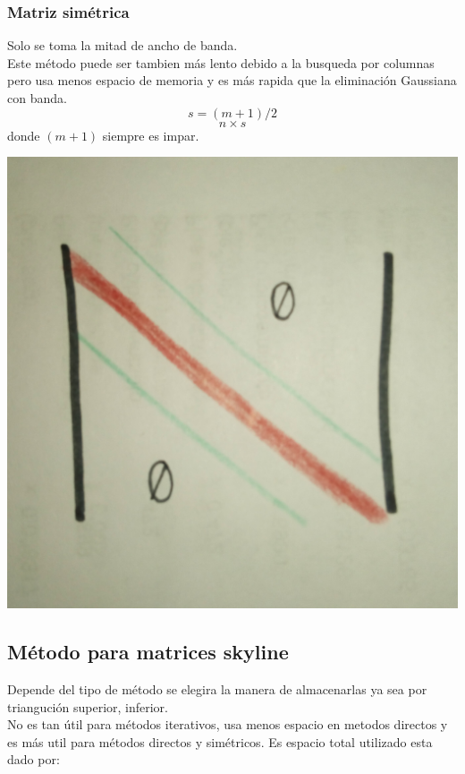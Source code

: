 \subsubsection{Matriz sim\'etrica}
Solo se toma la mitad de ancho de banda.\\
Este m\'etodo puede ser tambien m\'as lento debido a la busqueda por columnas pero usa menos espacio de memoria y es m\'as rapida que la eliminaci\'on Gaussiana con banda.
\begin{displaymath}
s=(m+1)/2
\end{displaymath}
\begin{displaymath}
n \times s
\end{displaymath}
donde $(m+1)$ siempre es impar.
\begin{center}
\includegraphics[scale=.05]{imagenes/11.jpg}
\end{center}
\subsection{M\'etodo para matrices skyline}
Depende del tipo de m\'etodo se elegira la manera de almacenarlas ya sea por trianguci\'on superior, inferior.\\
No es tan \'util para m\'etodos iterativos, usa menos espacio en metodos directos y es m\'as util para m\'etodos directos y sim\'etricos. Es espacio total utilizado esta dado por:
